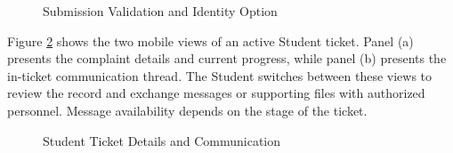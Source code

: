 \renewcommand{\thefigure}{5.8}
\begin{figure}[htbp]
    \centering
    \begin{minipage}[t]{0.43\linewidth}
        \centering
        \vspace{0pt}
        \par{}\par
    \end{minipage}\hspace{0.04\linewidth}
    \begin{minipage}[t]{0.43\linewidth}
        \centering
        \vspace{0pt}
        \par{}\par
    \end{minipage}
    \caption{Submission Validation and Identity Option}
    \label{fig:formerr}
\end{figure}
\FloatBarrier

Figure \ref{fig:sthread} shows the two mobile views of an active Student ticket. Panel (a) presents the complaint details and current progress, while panel (b) presents the in-ticket communication thread. The Student switches between these views to review the record and exchange messages or supporting files with authorized personnel. Message availability depends on the stage of the ticket.

\renewcommand{\thefigure}{5.9}
\begin{figure}[htbp]
    \centering
    \begin{minipage}[t]{0.43\linewidth}
        \centering
        \vspace{0pt}
        \par{}\par
    \end{minipage}\hspace{0.04\linewidth}
    \begin{minipage}[t]{0.43\linewidth}
        \centering
        \vspace{0pt}
        \par{}\par
    \end{minipage}
    \caption{Student Ticket Details and Communication}
    \label{fig:sthread}
\end{figure}
\FloatBarrier

